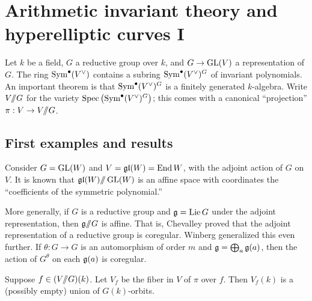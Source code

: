 
\section{Arithmetic invariant theory and hyperelliptic curves I}\label{sec:gross-i}





Let $k$ be a field, $G$ a reductive group over $k$, and 
$G\to \operatorname{GL}(V)$ a representation of $G$. The ring 
$\operatorname{Sym}^\bullet(V^\vee)$ contains a subring 
$\operatorname{Sym}^\bullet(V^\vee)^G$ of invariant polynomials. An important theorem 
is that $\operatorname{Sym}^\bullet(V^\vee)^G$ is a finitely generated $k$-algebra. 
Write $V/\!\!/ G$ for the variety 
$\operatorname{Spec}\left(\operatorname{Sym}^\bullet(V^\vee)^G\right)$; this comes with a 
canonical ``projection'' $\pi:V\to V/\!\!/ G$. 





\subsection{First examples and results}

\begin{example}
Consider $G=\operatorname{GL}(W)$ and $V=\mathfrak{gl}(W)=\operatorname{End} W$, with the 
adjoint action of $G$ on $V$. It is known that 
$\mathfrak{gl}(W)/\!\!/ \operatorname{GL}(W)$ is an affine space with coordinates the 
``coefficients of the symmetric polynomial.'' 
\end{example}

More generally, if $G$ is a reductive group and $\mathfrak{g}=\operatorname{Lie} G$ under the 
adjoint representation, then $\mathfrak{g}/\!\!/ G$ is affine. That is, Chevalley 
proved that the adjoint representation of a reductive group is coregular. 
Winberg generalized this even further. If $\theta:G\to G$ is an 
automorphism of order $m$ and $\mathfrak{g}=\bigoplus_a \mathfrak{g}(a)$, then 
the action of $G^\theta$ on each $\mathfrak{g}(a)$ is coregular. 

Suppose $f\in (V/\!\!/ G)(k)$. Let $V_f$ be the fiber in $V$ of $\pi$ over $f$. 
Then $V_f(k)$ is a (possibly empty) union of $G(k)$-orbits. 

